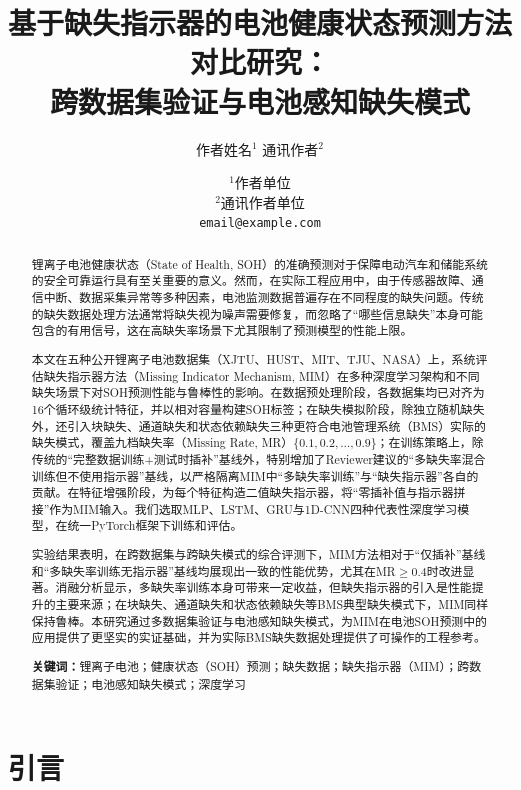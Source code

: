 \documentclass[10pt,a4paper]{ctexart}
\title{\textbf{基于缺失指示器的电池健康状态预测方法对比研究：\\跨数据集验证与电池感知缺失模式}}
\author{作者姓名$^{1}$ \quad 通讯作者$^{2}$}
\date{$^{1}$作者单位 \\ $^{2}$通讯作者单位 \\ \texttt{email@example.com}}
\begin{document}
\maketitle

\begin{abstract}
锂离子电池健康状态（State of Health, SOH）的准确预测对于保障电动汽车和储能系统的安全可靠运行具有至关重要的意义。然而，在实际工程应用中，由于传感器故障、通信中断、数据采集异常等多种因素，电池监测数据普遍存在不同程度的缺失问题。传统的缺失数据处理方法通常将缺失视为噪声需要修复，而忽略了“哪些信息缺失”本身可能包含的有用信号，这在高缺失率场景下尤其限制了预测模型的性能上限。

本文在五种公开锂离子电池数据集（XJTU、HUST、MIT、TJU、NASA）上，系统评估缺失指示器方法（Missing Indicator Mechanism, MIM）在多种深度学习架构和不同缺失场景下对SOH预测性能与鲁棒性的影响。在数据预处理阶段，各数据集均已对齐为16个循环级统计特征，并以相对容量构建SOH标签；在缺失模拟阶段，除独立随机缺失外，还引入块缺失、通道缺失和状态依赖缺失三种更符合电池管理系统（BMS）实际的缺失模式，覆盖九档缺失率（Missing Rate, MR）$\{0.1, 0.2, \ldots, 0.9\}$；在训练策略上，除传统的“完整数据训练+测试时插补”基线外，特别增加了Reviewer建议的“多缺失率混合训练但不使用指示器”基线，以严格隔离MIM中“多缺失率训练”与“缺失指示器”各自的贡献。在特征增强阶段，为每个特征构造二值缺失指示器，将“零插补值与指示器拼接”作为MIM输入。我们选取MLP、LSTM、GRU与1D-CNN四种代表性深度学习模型，在统一PyTorch框架下训练和评估。

实验结果表明，在跨数据集与跨缺失模式的综合评测下，MIM方法相对于“仅插补”基线和“多缺失率训练无指示器”基线均展现出一致的性能优势，尤其在MR$\geq 0.4$时改进显著。消融分析显示，多缺失率训练本身可带来一定收益，但缺失指示器的引入是性能提升的主要来源；在块缺失、通道缺失和状态依赖缺失等BMS典型缺失模式下，MIM同样保持鲁棒。本研究通过多数据集验证与电池感知缺失模式，为MIM在电池SOH预测中的应用提供了更坚实的实证基础，并为实际BMS缺失数据处理提供了可操作的工程参考。

\textbf{关键词：}锂离子电池；健康状态（SOH）预测；缺失数据；缺失指示器（MIM）；跨数据集验证；电池感知缺失模式；深度学习
\end{abstract}

\section{引言}\label{sec:intro}
\end{document}
